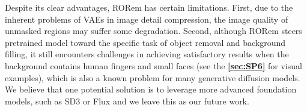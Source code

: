 \documentclass[10pt,twocolumn,letterpaper]{article}
\begin{document}
Despite its clear advantages, RORem has certain limitations. First, due to the inherent problems of VAEs in image detail compression, the image quality of unmasked regions may suffer some degradation. Second, although RORem steers pretrained model toward the specific task of object removal and background filling, it still encounters challenges in achieving satisfactory results when the background contains human fingers and small faces (see the \textbf{\cref{sec:SP6}} for visual examples), which is also a known problem for many generative diffusion models. We believe that one potential solution is to leverage more advanced foundation models, such as SD3 or Flux and we leave this as our future work.



{
    \small
    
    
}


\end{document}
